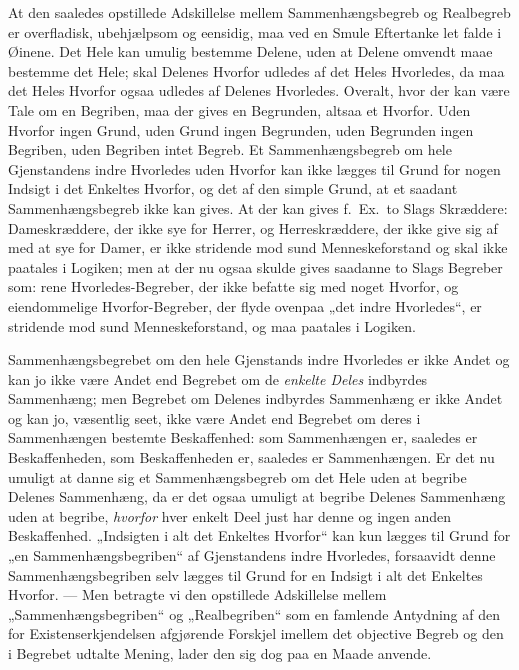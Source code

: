 \documentclass[12pt]{book}
\newcommand{\opage}[1]{\marginnote{\footnotesize\textit{[#1]}}}
\begin{document}
At den saaledes opstillede Adskillelse mellem Sammenhængsbegreb
og Realbegreb er overfladisk, ubehjælpsom og
eensidig, maa ved en Smule Eftertanke let falde i Øinene.
Det Hele kan umulig bestemme Delene, uden at Delene omvendt
maae bestemme det Hele; skal Delenes Hvorfor udledes
af det Heles Hvorledes, da maa det Heles Hvorfor ogsaa
udledes af Delenes Hvorledes. Overalt, hvor der kan være
Tale om en Begriben, maa der gives en Begrunden, altsaa
et Hvorfor. Uden Hvorfor ingen Grund, uden Grund ingen
Begrunden, uden Begrunden ingen Begriben, uden Begriben
intet Begreb. Et Sammenhængsbegreb om hele Gjenstandens
indre Hvorledes uden Hvorfor kan ikke lægges til Grund for
nogen Indsigt i det Enkeltes Hvorfor, og det af den simple
Grund, at et saadant Sammenhængsbegreb ikke kan gives.
At der kan gives f.\ Ex.\ to Slags Skræddere: Dameskræddere,
der ikke sye for Herrer, og Herreskræddere, der ikke give sig
af med at sye for Damer, er ikke stridende mod sund Menneskeforstand
og skal ikke paatales i Logiken; men at der nu ogsaa
skulde gives saadanne to Slags Begreber som: rene Hvorledes-Begreber,
der ikke befatte sig med noget Hvorfor, og eiendommelige
Hvorfor-Begreber, der flyde ovenpaa „det indre
Hvorledes“, er stridende mod sund Menneskeforstand, og maa
paatales i Logiken.

Sammenhængsbegrebet om den hele Gjenstands indre
Hvorledes er ikke Andet og kan jo ikke være Andet end Begrebet
om de \emph{enkelte Deles} indbyrdes Sammenhæng; men
Begrebet om Delenes indbyrdes Sammenhæng er ikke Andet
og kan jo, væsentlig seet, ikke være Andet end Begrebet
om deres i Sammenhængen bestemte Beskaffenhed: som
Sammenhængen er, saaledes er Beskaffenheden, som Beskaffenheden
er, saaledes er Sammenhængen. Er det nu
umuligt at danne sig et Sammenhængsbegreb om det Hele
\opage{169}uden at begribe Delenes Sammenhæng, da er det ogsaa umuligt
at begribe Delenes Sammenhæng uden at begribe, \emph{hvorfor}
hver enkelt Deel just har denne og ingen anden Beskaffenhed.
„Indsigten i alt det Enkeltes Hvorfor“ kan kun
lægges til Grund for „en Sammenhængsbegriben“ af Gjenstandens
indre Hvorledes, forsaavidt denne Sammenhængsbegriben
selv lægges til Grund for en Indsigt i alt det Enkeltes
Hvorfor. --- Men betragte vi den opstillede Adskillelse
mellem „Sammenhængsbegriben“ og „Realbegriben“ som en
famlende Antydning af den for Existenserkjendelsen afgjørende
Forskjel imellem det objective Begreb og den i Begrebet udtalte
Mening, lader den sig dog paa en Maade anvende.
\end{document}
